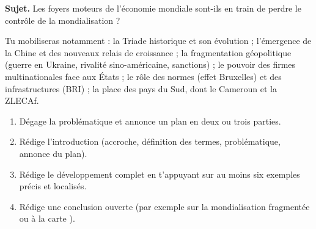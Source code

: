 \documentclass[11pt]{article}
\begin{document}
\begin{exercice}
\textbf{Sujet.} \og Les foyers moteurs de l'économie mondiale sont-ils en train de perdre le contrôle de la mondialisation ? \fg{}

Tu mobiliseras notamment : la Triade historique et son évolution ; l'émergence de la Chine et des nouveaux relais de croissance ; la fragmentation géopolitique (guerre en Ukraine, rivalité sino-américaine, sanctions) ; le pouvoir des firmes multinationales face aux États ; le rôle des normes (effet Bruxelles) et des infrastructures (BRI) ; la place des pays du Sud, dont le Cameroun et la ZLECAf.

\begin{enumerate}
\item Dégage la problématique et annonce un plan en deux ou trois parties.
\item Rédige l'introduction (accroche, définition des termes, problématique, annonce du plan).
\item Rédige le développement complet en t'appuyant sur au moins six exemples précis et localisés.
\item Rédige une conclusion ouverte (par exemple sur la mondialisation \og fragmentée \fg{} ou \og à la carte \fg{}).
\end{enumerate}
\end{exercice}
\end{document}
